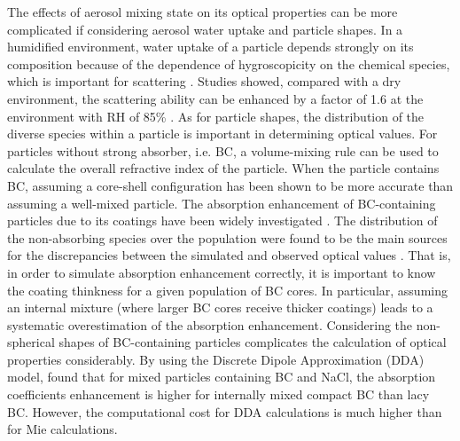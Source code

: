 \documentclass[edeposit,fullpage]{uiucthesis2009}
\begin{document}
The effects of aerosol mixing state on its optical properties can be
more complicated if considering aerosol water uptake and particle
shapes. In a humidified environment, water uptake of a particle
depends strongly on its composition because of the dependence of
hygroscopicity on the chemical species, which is important for
scattering \citep{MichelFlores2012, Zieger2013, Titos2014,
  Titos2016}. Studies showed, compared with a dry environment, the
scattering ability can be enhanced by a factor of 1.6 at the
environment with RH of 85\% \citep{Burgos2020}. As for particle
shapes, the distribution of the diverse species {\rm within} a
particle is important in determining optical values. For particles
without strong absorber, i.e. BC, a volume-mixing rule can be used to
calculate the overall refractive index of the particle. When the
particle contains BC, assuming a core-shell configuration has been
shown to be more accurate \citep{Bond2006} than assuming a well-mixed
particle. The absorption enhancement of BC-containing particles due to
its coatings have been widely investigated \citep{Moffet2009,Liu2017,
  wu2020light}. The distribution of the non-absorbing species over the
population were found to be the main sources for the discrepancies
between the simulated and observed optical values \citep{Fierce2016,
  Fierce2020}. That is, in order to simulate absorption enhancement
correctly, it is important to know the coating thinkness for a given
population of BC cores. In particular, assuming an internal mixture
(where larger BC cores receive thicker coatings) leads to a systematic
overestimation of the absorption enhancement. Considering the
non-spherical shapes of BC-containing particles complicates the
calculation of optical properties considerably. By using the Discrete
Dipole Approximation (DDA) model, \citet{scarnato2013effects} found
that for mixed particles containing BC and NaCl, the absorption
coefficients enhancement is higher for internally mixed compact BC
than lacy BC. However, the computational cost for DDA calculations is
much higher than for Mie calculations.
\end{document}
